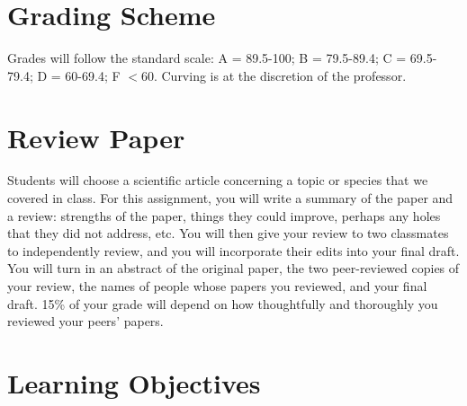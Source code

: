 \documentclass[letterpaper]{inzane_syllabus} %
\begin{document}
\vspace{0.5cm}
\section{Grading Scheme}

\begin{twentyshort}
\end{twentyshort}

Grades will follow the standard scale: A = 89.5-100; B = 79.5-89.4; C = 69.5-79.4; D = 60-69.4; F  $<$60. Curving is at the discretion of the professor. 


\vspace{0.5cm}
\section{Review Paper}

Students will choose a scientific article concerning a topic or species that we covered in class. For this assignment, you will write a summary of the paper and a review: strengths of the paper, things they could improve, perhaps any holes that they did not address, etc. You will then give your review to two classmates to independently review, and you will incorporate their edits into your final draft. You will turn in an abstract of the original paper, the two peer-reviewed copies of your review, the names of people whose papers you reviewed, and your final draft. 15\% of your grade will depend on how thoughtfully and thoroughly you reviewed your peers' papers.   


\vspace{0.5cm}
\section{Learning Objectives}
\end{document}
